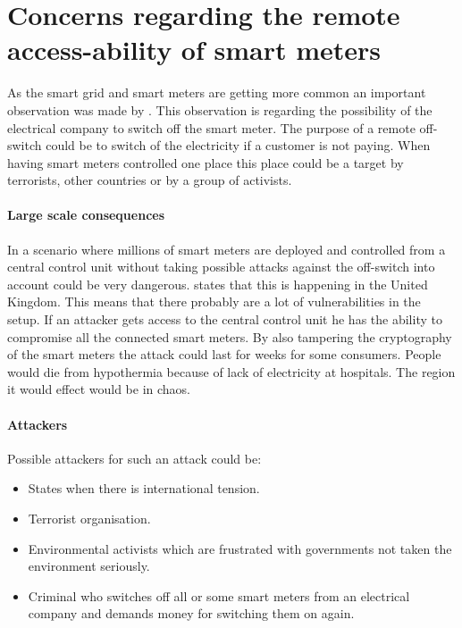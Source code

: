 
\section{Concerns regarding the remote access-ability of smart meters}\label{off_switch}
As the smart grid and smart meters are getting more common an important observation was made by \citet{offswitch}.
This observation is regarding the possibility of the electrical company to switch off the smart meter.
The purpose of a remote off-switch could be to switch of the electricity if a customer is not paying.
When having smart meters controlled one place this place could be a target by terrorists, other countries or by a group of activists. 

\paragraph{Large scale consequences}
In a scenario where millions of smart meters are deployed and controlled from a central control unit without taking possible attacks against the off-switch into account could be very dangerous.
\citet{offswitch} states that this is happening in the United Kingdom.
This means that there probably are a lot of vulnerabilities in the setup.
If an attacker gets access to the central control unit he has the ability to compromise all the connected smart meters.
By also tampering the cryptography of the smart meters the attack could last for weeks for some consumers.
People would die from hypothermia because of lack of electricity at hospitals.
The region it would effect would be in chaos.

\paragraph{Attackers}
Possible attackers for such an attack could be:
\begin{itemize}
\item States when there is international tension.
\item Terrorist organisation.
\item Environmental activists which are frustrated with governments not taken the environment seriously.
\item Criminal who switches off all or some smart meters from an electrical company and demands money for switching them on again.
\end{itemize}
